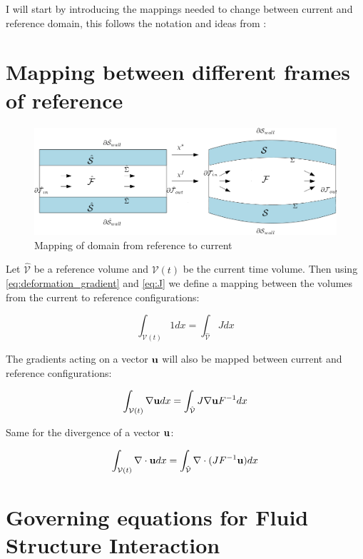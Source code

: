 I will start by introducing the mappings needed to change between current and reference domain, this follows the notation and ideas from \cite{Richter2016}:

\section{Mapping between different frames of reference}
\begin{figure}[H]
\label{pic:FSI_mapping}
\includegraphics[scale=0.45]{./FSI_ALE_formulation/FSI_mapping.png}
\caption{Mapping of domain from reference to current}
\end{figure}

Let $\hat{\mathcal{V}}$ be a reference volume and $\mathcal{V}(t)$ be the current time volume. Then using \eqref{eq:deformation_gradient} and \eqref{eq:J} we define a mapping between the volumes from the current to reference configurations:

\begin{equation}
 \int_{\mathcal{V}(t)} 1  dx = \int_{\hat{\mathcal{V}}} J dx  
\end{equation}

The gradients acting on a vector $ \bold{u} $ will also be mapped between current and reference configurations:

\begin{equation}
\int_{\mathcal{V}(t)} \nabla \bold{u}   dx = \int_{\hat{\mathcal{V}}} J  \nabla \bold{u}F^{-1} dx  
\end{equation}

Same for the divergence of a vector $ \bold{u}$:

\begin{equation}
\int_{\mathcal{V}(t)} \nabla \cdot \bold{u}   dx = \int_{\hat{\mathcal{V}}} \nabla \cdot( J  F^{-1} \bold{u}) dx  
\end{equation}

\section{Governing equations for Fluid Structure Interaction}

